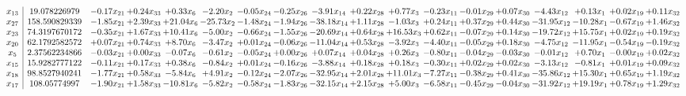 \documentclass[9pt]{article}
\begin{document}
 \[\begin{array}{c| c c@{\hskip 2pt} c@{\hskip 2pt} c@{\hskip 2pt} c@{\hskip 2pt} c@{\hskip 2pt} c@{\hskip 2pt} c@{\hskip 2pt} c@{\hskip 2pt} c@{\hskip 2pt} c@{\hskip 2pt} c@{\hskip 2pt} c@{\hskip 2pt} c@{\hskip 2pt} c@{\hskip 2pt} c@{\hskip 2pt} c@{\hskip 2pt} }
 x_{13}   &  19.078226979 & -0.17 x_{21} & +  0.24 x_{33} & +  0.33 x_{6} & -2.20 x_{2} & -0.05 x_{24} & -0.25 x_{26} & -3.91 x_{14} & +  0.22 x_{28} & +  0.77 x_{3} & -0.23 x_{11} & -0.01 x_{29} & +  0.07 x_{30} & -4.43 x_{12} & +  0.13 x_{1} & +  0.02 x_{19} & +  0.11 x_{32}\\
 x_{27}   &  158.590829339 & -1.85 x_{21} & +  2.39 x_{33} & + 21.04 x_{6} & -25.73 x_{2} & -1.48 x_{24} & -1.94 x_{26} & -38.18 x_{14} & +  1.11 x_{28} & -1.03 x_{3} & +  0.24 x_{11} & +  0.37 x_{29} & +  0.44 x_{30} & -31.95 x_{12} & -10.28 x_{1} & -0.67 x_{19} & +  1.46 x_{32}\\
 x_{23}   &  74.3197670172 & -0.35 x_{21} & +  1.67 x_{33} & + 10.41 x_{6} & -5.00 x_{2} & -0.66 x_{24} & -1.55 x_{26} & -20.69 x_{14} & +  0.64 x_{28} & + 16.53 x_{3} & +  0.62 x_{11} & -0.07 x_{29} & +  0.14 x_{30} & -19.72 x_{12} & + 15.75 x_{1} & +  0.02 x_{19} & +  0.19 x_{32}\\
 x_{20}   &  62.1792582572 & +  0.07 x_{21} & +  0.74 x_{33} & +  8.70 x_{6} & -3.47 x_{2} & +  0.01 x_{24} & -0.06 x_{26} & -11.04 x_{14} & +  0.53 x_{28} & -3.92 x_{3} & -4.40 x_{11} & -0.05 x_{29} & +  0.18 x_{30} & -4.75 x_{12} & -11.95 x_{1} & -0.54 x_{19} & -0.19 x_{32}\\
 x_{5}   &  2.37562234866 & -0.03 x_{21} & +  0.00 x_{33} & -0.07 x_{6} & -0.61 x_{2} & -0.05 x_{24} & +  0.00 x_{26} & +  0.07 x_{14} & +  0.04 x_{28} & +  0.26 x_{3} & -0.80 x_{11} & -0.04 x_{29} & -0.03 x_{30} & -0.01 x_{12} & +  0.70 x_{1} & -0.00 x_{19} & +  0.02 x_{32}\\
 x_{15}   &  15.9282777122 & -0.11 x_{21} & +  0.17 x_{33} & +  0.38 x_{6} & -0.84 x_{2} & +  0.01 x_{24} & -0.16 x_{26} & -3.88 x_{14} & +  0.18 x_{28} & +  0.18 x_{3} & -0.30 x_{11} & +  0.02 x_{29} & +  0.02 x_{30} & -3.13 x_{12} & -0.81 x_{1} & +  0.01 x_{19} & +  0.09 x_{32}\\
 x_{18}   &  98.8527940241 & -1.77 x_{21} & +  0.58 x_{33} & -5.84 x_{6} & +  4.91 x_{2} & -0.12 x_{24} & -2.07 x_{26} & -32.95 x_{14} & +  2.01 x_{28} & + 11.01 x_{3} & -7.27 x_{11} & -0.38 x_{29} & +  0.41 x_{30} & -35.86 x_{12} & + 15.30 x_{1} & +  0.65 x_{19} & +  1.19 x_{32}\\
 x_{17}   &  108.05774997 & -1.90 x_{21} & +  1.58 x_{33} & -10.81 x_{6} & -5.82 x_{2} & -0.58 x_{24} & -1.83 x_{26} & -32.15 x_{14} & +  2.15 x_{28} & +  5.00 x_{3} & -6.58 x_{11} & -0.45 x_{29} & -0.04 x_{30} & -31.92 x_{12} & + 19.19 x_{1} & +  0.78 x_{19} & +  1.29 x_{32}\\

\end{array}\]
\end{document}
